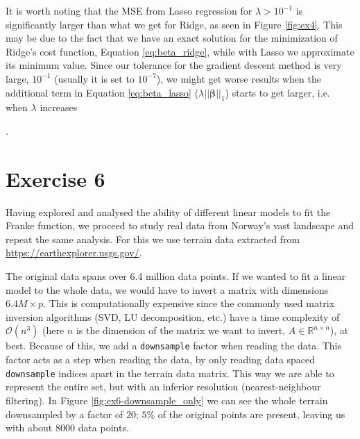 \documentclass[10pt, a4paper]{article}
\begin{document}
    \hypertarget{ridgevlasso}{It is worth noting that the MSE from Lasso regression for $\lambda > 10^{-1}$ is significantly larger than what we get for Ridge, as seen in Figure \ref{fig:ex4}. This may be due to the fact that we have an exact solution for the minimization of Ridge's cost function, Equation \eqref{eq:beta_ridge}, while with Lasso we approximate its minimum value. Since our tolerance for the gradient descent method is very large, $10^{-1}$ (usually it is set to $10^{-7}$), we might get worse results when the additional term in Equation \eqref{eq:beta_lasso} ($\lambda || \bm{\beta} ||_1$) starts to get larger, i.e. when $\lambda$ increases}.

\section*{Exercise 6}
    
    Having explored and analysed the ability of different linear models to fit the Franke function, we proceed to study real data from Norway's vast landscape and repeat the same analysis. For this we use terrain data extracted from \url{https://earthexplorer.usgs.gov/}.
    
    
    The original data spans over 6.4 million data points. If we wanted to fit a linear model to the whole data, we would have to invert a matrix with dimensions $6.4M \times p$. This is computationally expensive since the commonly used matrix inversion algorithms (SVD, LU decomposition, etc.) have a time complexity of $\mathcal{O}(n^3)$ (here $n$ is the dimension of the matrix we want to invert, $A \in \mathbb{R}^{n \times n}$), at best. Because of this, we add a \texttt{downsample} factor when reading the data. This factor acts as a step when reading the data, by only reading data spaced \texttt{downsample} indices apart in the terrain data matrix. This way we are able to represent the entire set, but with an inferior resolution (nearest-neighbour filtering). In Figure \ref{fig:ex6-downsample_only} we can see the whole terrain downsampled by a factor of $20$; $5\%$ of the original points are present, leaving us with about $8000$ data points.
    
\end{document}
